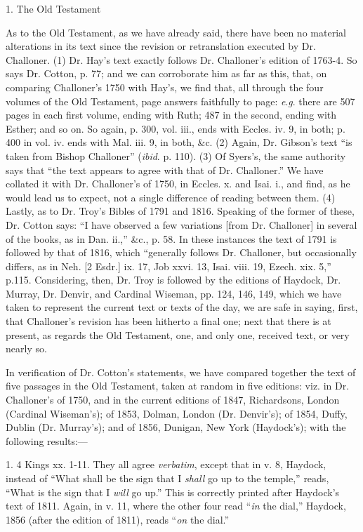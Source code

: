 1. The Old Testament

As to the Old Testament, as we have already said, there have
been no material alterations in its text since the revision or
retranslation executed by Dr. Challoner. (1) Dr. Hay's text exactly
follows Dr. Challoner's edition of 1763-4. So says Dr. Cotton, p. 77;
and we can corroborate him as far as this, that, on comparing
Challoner's 1750 with Hay's, we find that, all through the four
volumes of the Old Testament, page answers faithfully to page: \emph{e}.\emph{g}.
there are 507 pages in each first volume, ending with Ruth; 487 in the
second, ending with Esther; and so on. So again, p. 300, vol. iii.,
ends with Eccles. iv. 9, in both; p. 400 in vol. iv. ends with Mal.
iii. 9, in both, \&c. (2) Again, Dr. Gibson's text ``is taken
from Bishop Challoner'' (\emph{ibid}. p. 110). (3) Of Syers's, the
same authority says that ``the text appears to agree with that of
Dr. Challoner.'' We have collated it with Dr. Challoner's of 1750,
in Eccles. x. and Isai. i., and find, as he would lead us to expect,
not a single difference of reading between them. (4) Lastly, as to Dr.
Troy's Bibles of 1791 and 1816. Speaking of the former of these, Dr.
Cotton says: ``I have observed a few variations [from Dr. Challoner]
in several of the books, as in Dan. ii.,'' \&c., p. 58. In these
instances the text of 1791 is followed by that of 1816, which
``generally follows Dr. Challoner, but occasionally differs, as in
Neh. [2 Esdr.] ix. 17, Job xxvi. 13, Isai. viii. 19, Ezech. xix.
5,'' p.115. Considering, then, Dr. Troy is followed by the
editions of Haydock, Dr. Murray, Dr. Denvir, and Cardinal Wiseman, pp.
124, 146, 149, which we have taken to represent the current text or
texts of the day, we are safe in saying, first, that Challoner's
revision has been hitherto a final one; next that there is at
present, as regards the Old Testament, one, and only one, received
text, or very nearly so.

In verification of Dr. Cotton's statements, we have compared
together the text of five passages in the Old Testament, taken at
random in five editions: viz. in Dr. Challoner's of 1750, and in the
current editions of 1847, Richardsons, London (Cardinal Wiseman's); of
1853, Dolman, London (Dr. Denvir's); of 1854, Duffy, Dublin (Dr.
Murray's); and of 1856, Dunigan, New York (Haydock's); with the
following results:—

1. 4 Kings xx. 1-11. They all agree \emph{verbatim}, except that in
v. 8, Haydock, instead of ``What shall be the sign that I \emph{shall}
go up to the temple,'' reads, ``What is the sign that I \emph{will}
go up.'' This is correctly printed after Haydock's text of 1811.
Again, in v. 11, where the other four read ``\emph{in} the
dial,'' Haydock, 1856 (after the edition of 1811), reads ``\emph{on}
the dial.''

